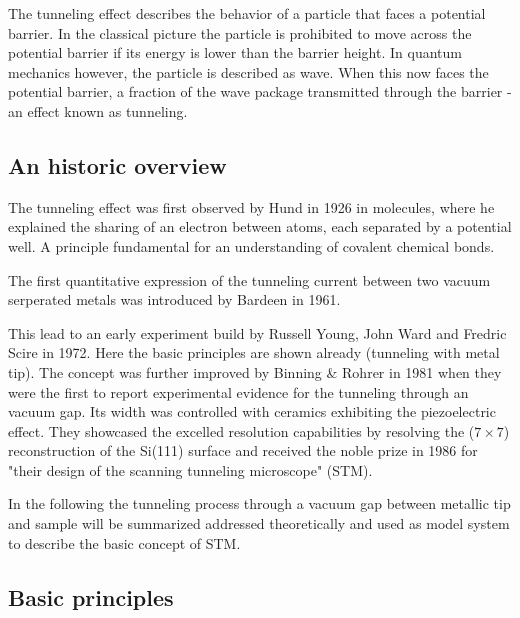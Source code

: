 The tunneling effect describes the behavior of a particle that faces a potential barrier. In the classical picture the particle is prohibited to move across the potential barrier if its energy is lower than the barrier height. In quantum mechanics however, the particle is described as wave. When this now faces the potential barrier, a fraction of the wave package transmitted through the barrier - an effect known as tunneling.

\subsection{An historic overview}
The tunneling effect was first observed by Hund in 1926 in molecules, where he explained the sharing of an electron between atoms, each separated by a potential well.\cite{Mehra_tunneling_1982} A principle fundamental for an understanding of covalent chemical bonds. 

The first quantitative expression of the tunneling current between two vacuum serperated metals was introduced by Bardeen in 1961.\cite{Bardeen_tunneling_1961} 

This lead to an early experiment build by Russell Young, John Ward and Fredric Scire in 1972.\cite{Young_topographiner_1972} Here the basic principles are shown already (tunneling with metal tip). The concept was further improved by Binning \& Rohrer in 1981 \cite{binning_tunneling_1982} when they were the first to report experimental evidence for the tunneling through an vacuum gap. Its width was controlled with ceramics exhibiting the piezoelectric effect. They showcased the excelled resolution capabilities by resolving the ($7 \times 7$) reconstruction of the Si(111) surface \cite{binnig_1983} and received the noble prize in 1986 for "their design of the scanning tunneling microscope" (STM).\cite{_noble_price_1986} 

In the following the tunneling process through a vacuum gap between metallic tip and sample will be summarized addressed theoretically and used as model system to describe the basic concept of STM.

\subsection{Basic principles}

